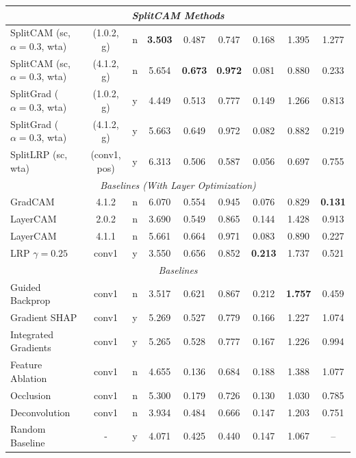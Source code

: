 \begin{table}[htb!]
\begin{tabular}{p{4cm}|cc|cccccc}
         \midrule
        \multicolumn{9}{c}{\textit{SplitCAM Methods}} \\
        \midrule
        SplitCAM (sc, $\alpha = 0.3$, wta) & (1.0.2, g) & n & \fboxsep=0.5pt\colorbox{red!20}{\textbf{3.503}} & 0.487 & 0.747 & 0.168 & 1.395 & 1.277 \\
        SplitCAM (sc, $\alpha = 0.3$, wta) & (4.1.2, g) & n & 5.654 & \fboxsep=0.5pt\colorbox{red!20}{\textbf{0.673}} & \fboxsep=0.5pt\colorbox{red!20}{\textbf{0.972}} & 0.081 & 0.880 & 0.233 \\
        SplitGrad ($\alpha = 0.3$, wta) & (1.0.2, g) & y & 4.449 & 0.513 & 0.777 & 0.149 & 1.266 & 0.813 \\
        SplitGrad ($\alpha = 0.3$, wta) & (4.1.2, g) & y & 5.663 & 0.649 & 0.972 & 0.082 & 0.882 & 0.219 \\
        SplitLRP (sc, wta) & (conv1, pos) & y & 6.313 & 0.506 & 0.587 & 0.056 & 0.697 & 0.755 \\
        \midrule
        \multicolumn{9}{c}{\textit{Baselines (With Layer Optimization)}} \\
        \midrule
        GradCAM & 4.1.2 & n & 6.070 & 0.554 & 0.945 & 0.076 & 0.829 & \fboxsep=0.5pt\colorbox{red!20}{\textbf{0.131}} \\
        LayerCAM & 2.0.2 & n & 3.690 & 0.549 & 0.865 & 0.144 & 1.428 & 0.913 \\
        LayerCAM & 4.1.1 & n & 5.661 & 0.664 & 0.971 & 0.083 & 0.890 & 0.227 \\
        LRP $\gamma=0.25$ & conv1 & y & 3.550 & 0.656 & 0.852 & \fboxsep=0.5pt\colorbox{red!20}{\textbf{0.213}} & 1.737 & 0.521 \\
        \midrule
        \multicolumn{9}{c}{\textit{Baselines}} \\
        \midrule
        Guided Backprop & conv1 & n & 3.517 & 0.621 & 0.867 & 0.212 & \fboxsep=0.5pt\colorbox{red!20}{\textbf{1.757}} & 0.459 \\
        Gradient SHAP & conv1 & y & 5.269 & 0.527 & 0.779 & 0.166 & 1.227 & 1.074 \\
        Integrated Gradients & conv1 & y & 5.265 & 0.528 & 0.777 & 0.167 & 1.226 & 0.994 \\
        Feature Ablation & conv1 & n & 4.655 & 0.136 & 0.684 & 0.188 & 1.388 & 1.077 \\
        Occlusion & conv1 & n & 5.300 & 0.179 & 0.726 & 0.130 & 1.030 & 0.785 \\
        Deconvolution & conv1 & n & 3.934 & 0.484 & 0.666 & 0.147 & 1.203 & 0.751 \\
        Random Baseline & - & y & 4.071 & 0.425 & 0.440 & 0.147 & 1.067 & -- \\
        \bottomrule
    \end{tabular}
\end{table}

